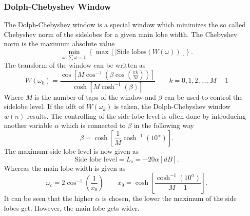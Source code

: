 \subsubsection{Dolph-Chebyshev Window}
The Dolph-Chebyshev window is a special window which minimizes the so called Chebyshev norm of the sidelobes for a given main lobe width. The Chebyshev norm is the maximum absolute value
\begin{equation}
    \min_{\omega, \sum \omega = 1} \left \{ \max \left[ | \text{Side lobes}(W(\omega))\right | ]\right \}.
\end{equation}
The transform of the window can be written as
\begin{equation}
    W(\omega_k) = \frac{\cos{ \left [ M \cos^{-1}{\left ( \beta \cos{ \left (\frac{\pi k}{M} \right )} \right)}\right ]}}{\cosh{\left [ M \cosh^{-1}{\left ( \beta \right ) }\right ]}} \qquad k = 0,1,2, \dots, M-1
\end{equation}
Where $M$ is the number of taps of the window and $\beta$ can be used to control the sidelobe level.
If the \acrfull{idft} of $W(\omega_k)$ is taken, the Dolph-Chebyshev window $w(n)$ results.
The controlling of the side lobe level is often done by introducing another variable $\alpha$ which is connected to $\beta$ in the following way
\begin{equation}
    \beta = \cosh{\left [ \frac{1}{M} \cosh^{-1}{\left ( 10^{\alpha} \right ) } \right ]}.
\end{equation}
The maximum side lobe level is now given as
\begin{equation}
    \text{Side lobe level} = L_s =  -20\alpha [dB].
\end{equation}
Whereas the main lobe width is given as
\begin{equation}
    \omega_c = 2 \cos^{-1}{ \left ( \frac{1}{x_0} \right )} \qquad x_0 = \cosh{ \left [ \frac{\cosh^{-1}{\left ( 10^{\alpha} \right )}}{M-1}\right ]}.
\end{equation}
It can be seen that the higher $\alpha$ is chosen, the lower the maximum of the side lobes get. However, the main lobe gets wider.
